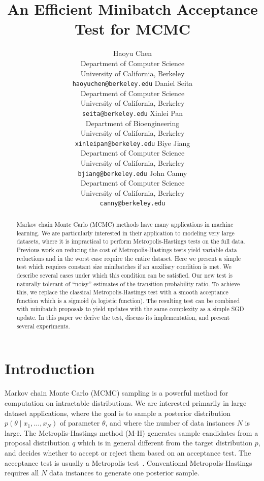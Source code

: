\documentclass{article}
\title{An Efficient Minibatch Acceptance Test for MCMC}
\author{
  Haoyu Chen \\
  Department of Computer Science \\
  University of California, Berkeley \\
  \texttt{haoyuchen@berkeley.edu}
  \And
  Daniel Seita \\
  Department of Computer Science \\
  University of California, Berkeley \\
  \texttt{seita@berkeley.edu}
  \And
  Xinlei Pan \\
  Department of Bioengineering \\
  University of California, Berkeley \\
  \texttt{xinleipan@berkeley.edu}
  \And 
  Biye Jiang \\
  Department of Computer Science \\
  University of California, Berkeley \\
  \texttt{bjiang@berkeley.edu}
  \And
  John Canny \\
  Department of Computer Science \\
  University of California, Berkeley \\
  \texttt{canny@berkeley.edu}
}
\begin{document}
\maketitle

\begin{abstract}
Markov chain Monte Carlo (MCMC) methods have many applications in
machine learning. We are particularly interested in their application
to modeling very large datasets, where it is impractical to
perform Metropolis-Hastings tests on the full data. Previous work on reducing
the cost of Metropolis-Hastings tests yield variable data reductions
and in the worst case require the entire dataset. 
Here we present a simple test which requires constant size minibatches
if an auxiliary condition is met. We describe several cases under which
this condition can be satisfied. Our new test is naturally tolerant
of ``noisy'' estimates of the transition probability ratio. To achieve
this, we replace the classical Metropolis-Hastings test with a smooth
acceptance function which is a sigmoid (a logistic function). 
The resulting test can be combined with minibatch proposals to yield
updates with the same complexity as a simple SGD update. In this paper we
derive the test, discuss its implementation, and present several
experiments.
\end{abstract}



\section{Introduction}\label{sec:introduction}

Markov chain Monte Carlo (MCMC) sampling is a powerful method for
computation on intractable distributions. We are interested primarily
in large dataset applications, where the goal is to sample a posterior
distribution $p(\theta \mid x_1, \ldots, x_N)$ of parameter $\theta$,
and where the number of data instances $N$ is large.  The
Metroplis-Hastings method (M-H) generates sample candidates from a
proposal distribution $q$ which is in general different from the
target distribution $p$, and decides whether to accept or reject them
based on an acceptance test. The acceptance test is usually a
Metropolis test~\cite{Metropolis1953,hastings70}. Conventional
Metropolis-Hastings requires all $N$ data instances to generate one
posterior sample.
\end{document}
